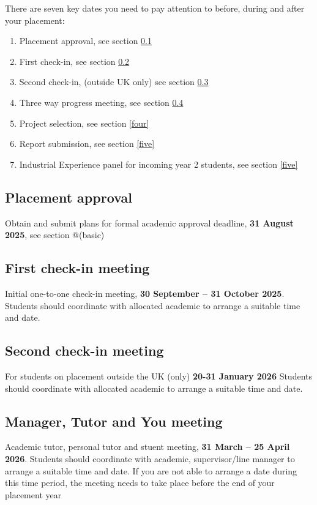 \documentclass[
]{book}
\providecommand{\tightlist}{%
  \setlength{\itemsep}{0pt}\setlength{\parskip}{0pt}}
\begin{document}
There are seven key dates you need to pay attention to before, during and after your placement:

\begin{enumerate}
\def\labelenumi{\arabic{enumi}.}
\tightlist
\item
  Placement approval, see section \ref{approval}
\item
  First check-in, see section \ref{one}
\item
  Second check-in, (outside UK only) see section \ref{two}
\item
  Three way progress meeting, see section \ref{three}
\item
  Project selection, see section \ref{four}
\item
  Report submission, see section \ref{five}
\item
  Industrial Experience panel for incoming year 2 students, see section \ref{five}
\end{enumerate}

\subsection{Placement approval}\label{approval}

Obtain and submit plans for formal academic approval deadline, \textbf{31 August 2025}, see section @(basic)

\subsection{First check-in meeting}\label{one}

Initial one-to-one check-in meeting, \textbf{30 September -- 31 October 2025}. Students should coordinate with allocated academic to arrange a suitable time and date.

\subsection{Second check-in meeting}\label{two}

For students on placement outside the UK (only) \textbf{20-31 January 2026} Students should coordinate with allocated academic to arrange a suitable time and date.

\subsection{Manager, Tutor and You meeting}\label{three}

Academic tutor, personal tutor and stuent meeting, \textbf{31 March -- 25 April 2026}. Students should coordinate with academic, supervisor/line manager to arrange a suitable time and date. If you are not able to arrange a date during this time period, the meeting needs to take place before the end of your placement year
\end{document}
